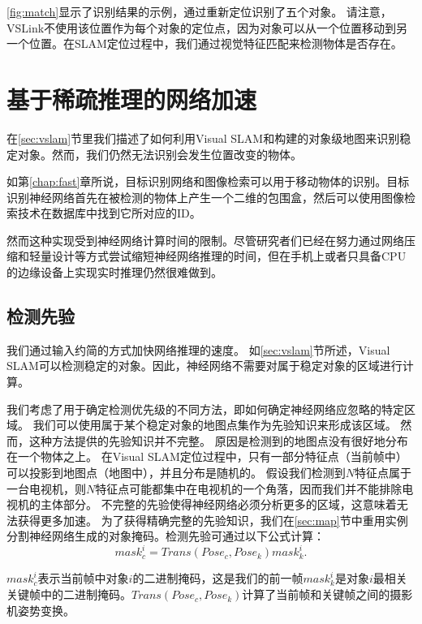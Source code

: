 \autoref{fig:match}显示了识别结果的示例，通过重新定位识别了五个对象。
请注意，VSLink不使用该位置作为每个对象的定位点，因为对象可以从一个位置移动到另一个位置。在SLAM定位过程中，我们通过视觉特征匹配来检测物体是否存在。


\section{基于稀疏推理的网络加速}
\label{sub:Sparse Object Detection}
在\ref{sec:vslam}节里我们描述了如何利用Visual SLAM和构建的对象级地图来识别稳定对象。然而，我们仍然无法识别会发生位置改变的物体。

如第\ref{chap:fast}章所说，目标识别网络和图像检索可以用于移动物体的识别。目标识别神经网络首先在被检测的物体上产生一个二维的包围盒，然后可以使用图像检索技术在数据库中找到它所对应的ID。

然而这种实现受到神经网络计算时间的限制。尽管研究者们已经在努力通过网络压缩和轻量设计等方式尝试缩短神经网络推理的时间，但在手机上或者只具备CPU的边缘设备上实现实时推理仍然很难做到。


\subsection{检测先验}

我们通过输入约简的方式加快网络推理的速度。
如\ref{sec:vslam}节所述，Visual SLAM可以检测稳定的对象。因此，神经网络不需要对属于稳定对象的区域进行计算。

我们考虑了用于确定检测优先级的不同方法，即如何确定神经网络应忽略的特定区域。
我们可以使用属于某个稳定对象的地图点集作为先验知识来形成该区域。
然而，这种方法提供的先验知识并不完整。
原因是检测到的地图点没有很好地分布在一个物体之上。
在Visual SLAM定位过程中，只有一部分特征点（当前帧中）可以投影到地图点（地图中），并且分布是随机的。
假设我们检测到$N$特征点属于一台电视机，则$N$特征点可能都集中在电视机的一个角落，因而我们并不能排除电视机的主体部分。
不完整的先验使得神经网络必须分析更多的区域，这意味着无法获得更多加速。
为了获得精确完整的先验知识，我们在\ref{sec:map}节中重用实例分割神经网络生成的对象掩码。检测先验可通过以下公式计算：
\begin{equation}\label{equ:mask}
mask_c^i = Trans(Pose_c,Pose_k)mask_k^i.
\end{equation} 

$mask_c^i$表示当前帧中对象$i$的二进制掩码，这是我们的前一帧$mask_k^i$是对象$i$最相关关键帧中的二进制掩码。$Trans(Pose_c, Pose_k)$计算了当前帧和关键帧之间的摄影机姿势变换。

